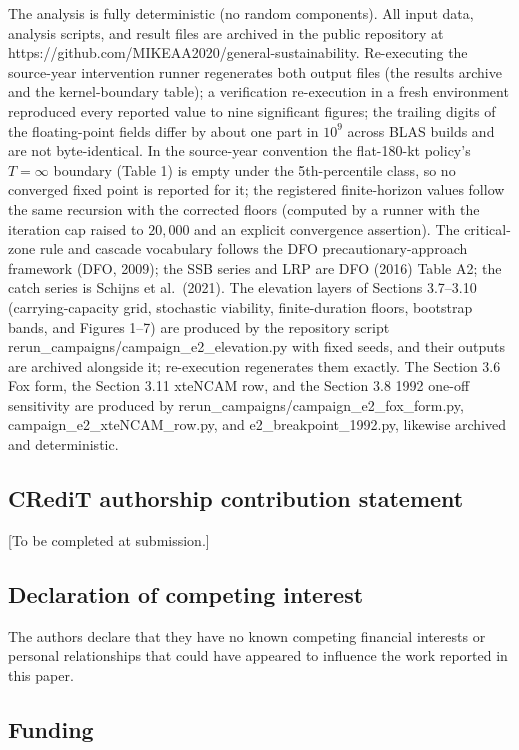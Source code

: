 \documentclass[11pt]{article}
\begin{document}
The analysis is fully deterministic (no random components). All input
data, analysis scripts, and result files are archived in the public
repository at https://github.com/MIKEAA2020/general-sustainability.
Re-executing the source-year intervention runner regenerates both output
files (the results archive and the kernel-boundary table); a
verification re-execution in a fresh environment reproduced every
reported value to nine significant figures; the trailing digits of the
floating-point fields differ by about one part in \(10^{9}\) across BLAS
builds and are not byte-identical. In the source-year convention the flat-180-kt policy's
\(T=\infty\) boundary (Table 1) is empty under the 5th-percentile class,
so no converged fixed point is reported for it; the registered
finite-horizon values follow the same recursion with the corrected
floors (computed by a runner with the iteration cap raised to
\(20{,}000\) and an explicit convergence assertion). The critical-zone
rule and cascade vocabulary follows the DFO precautionary-approach
framework (DFO, 2009); the SSB series and LRP are DFO (2016) Table A2;
the catch series is Schijns et al.~(2021). The elevation layers of
Sections 3.7--3.10 (carrying-capacity grid, stochastic viability,
finite-duration floors, bootstrap bands, and Figures 1--7) are produced
by the repository script rerun\_campaigns/campaign\_e2\_elevation.py
with fixed seeds, and their outputs are archived alongside it;
re-execution regenerates them exactly. The Section 3.6 Fox form, the
Section 3.11 xteNCAM row, and the Section 3.8 1992 one-off sensitivity
are produced by rerun\_campaigns/campaign\_e2\_fox\_form.py,
campaign\_e2\_xteNCAM\_row.py, and e2\_breakpoint\_1992.py, likewise
archived and deterministic.

\subsection*{CRediT authorship contribution statement}

{[}To be completed at submission.{]}

\subsection*{Declaration of competing interest}

The authors declare that they have no known competing financial
interests or personal relationships that could have appeared to
influence the work reported in this paper.

\subsection*{Funding}
\end{document}
